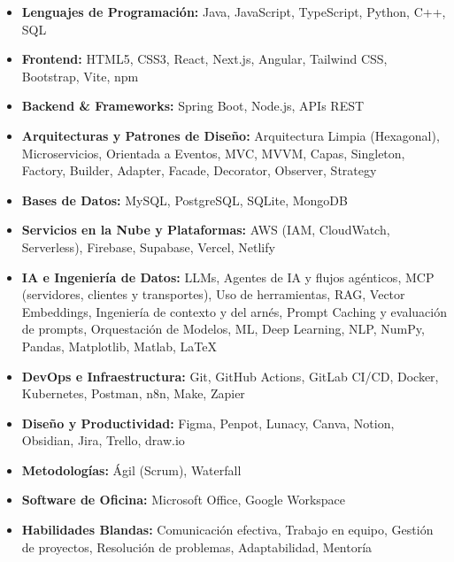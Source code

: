 \begin{itemize}[leftmargin=0.15in, label={}]
    \item \textbf{Lenguajes de Programación:} Java, JavaScript, TypeScript, Python, C++, SQL
    \item \textbf{Frontend:} HTML5, CSS3, React, Next.js, Angular, Tailwind CSS, Bootstrap, Vite, npm
    \item \textbf{Backend \& Frameworks:} Spring Boot, Node.js, APIs REST
    \item \textbf{Arquitecturas y Patrones de Diseño:} Arquitectura Limpia (Hexagonal), Microservicios, Orientada a Eventos, MVC, MVVM, Capas, Singleton, Factory, Builder, Adapter, Facade, Decorator, Observer, Strategy
    \item \textbf{Bases de Datos:} MySQL, PostgreSQL, SQLite, MongoDB
    \item \textbf{Servicios en la Nube y Plataformas:} AWS (IAM, CloudWatch, Serverless), Firebase, Supabase, Vercel, Netlify
    \item \textbf{IA e Ingeniería de Datos:} LLMs, Agentes de IA y flujos agénticos, MCP (servidores, clientes y transportes), Uso de herramientas, RAG, Vector Embeddings, Ingeniería de contexto y del arnés, Prompt Caching y evaluación de prompts, Orquestación de Modelos, ML, Deep Learning, NLP, NumPy, Pandas, Matplotlib, Matlab, \LaTeX
    \item \textbf{DevOps e Infraestructura:} Git, GitHub Actions, GitLab CI/CD, Docker, Kubernetes, Postman, n8n, Make, Zapier
    \item \textbf{Diseño y Productividad:} Figma, Penpot, Lunacy, Canva, Notion, Obsidian, Jira, Trello, draw.io
    \item \textbf{Metodologías:} Ágil (Scrum), Waterfall
    \item \textbf{Software de Oficina:} Microsoft Office, Google Workspace
    \item \textbf{Habilidades Blandas:} Comunicación efectiva, Trabajo en equipo, Gestión de proyectos, Resolución de problemas, Adaptabilidad, Mentoría
\end{itemize}
